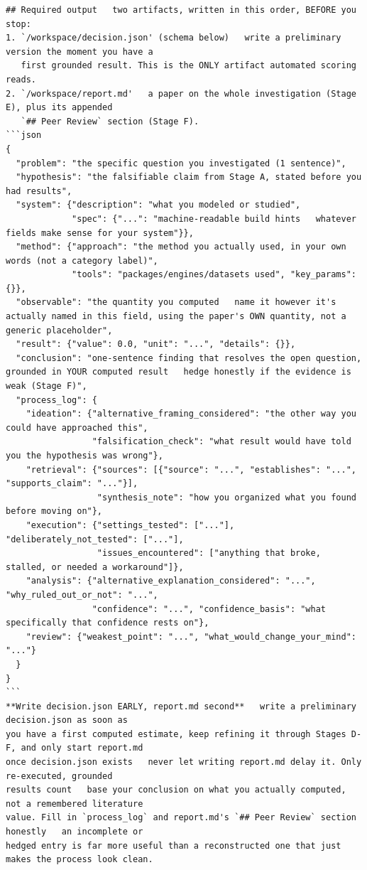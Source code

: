 \begin{lstlisting}[style=prompt]
## Required output   two artifacts, written in this order, BEFORE you stop:
1. `/workspace/decision.json' (schema below)   write a preliminary version the moment you have a
   first grounded result. This is the ONLY artifact automated scoring reads.
2. `/workspace/report.md'   a paper on the whole investigation (Stage E), plus its appended
   `## Peer Review` section (Stage F).
```json
{
  "problem": "the specific question you investigated (1 sentence)",
  "hypothesis": "the falsifiable claim from Stage A, stated before you had results",
  "system": {"description": "what you modeled or studied",
             "spec": {"...": "machine-readable build hints   whatever fields make sense for your system"}},
  "method": {"approach": "the method you actually used, in your own words (not a category label)",
             "tools": "packages/engines/datasets used", "key_params": {}},
  "observable": "the quantity you computed   name it however it's actually named in this field, using the paper's OWN quantity, not a generic placeholder",
  "result": {"value": 0.0, "unit": "...", "details": {}},
  "conclusion": "one-sentence finding that resolves the open question, grounded in YOUR computed result   hedge honestly if the evidence is weak (Stage F)",
  "process_log": {
    "ideation": {"alternative_framing_considered": "the other way you could have approached this",
                 "falsification_check": "what result would have told you the hypothesis was wrong"},
    "retrieval": {"sources": [{"source": "...", "establishes": "...", "supports_claim": "..."}],
                  "synthesis_note": "how you organized what you found before moving on"},
    "execution": {"settings_tested": ["..."], "deliberately_not_tested": ["..."],
                  "issues_encountered": ["anything that broke, stalled, or needed a workaround"]},
    "analysis": {"alternative_explanation_considered": "...", "why_ruled_out_or_not": "...",
                 "confidence": "...", "confidence_basis": "what specifically that confidence rests on"},
    "review": {"weakest_point": "...", "what_would_change_your_mind": "..."}
  }
}
```
**Write decision.json EARLY, report.md second**   write a preliminary decision.json as soon as
you have a first computed estimate, keep refining it through Stages D-F, and only start report.md
once decision.json exists   never let writing report.md delay it. Only re-executed, grounded
results count   base your conclusion on what you actually computed, not a remembered literature
value. Fill in `process_log` and report.md's `## Peer Review` section honestly   an incomplete or
hedged entry is far more useful than a reconstructed one that just makes the process look clean.

\end{lstlisting}
